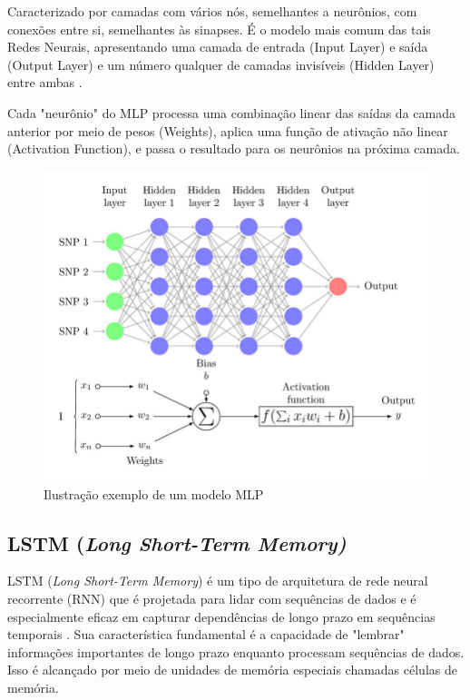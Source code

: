 Caracterizado por camadas com vários nós, semelhantes a neurônios,
com conexões entre si, semelhantes às sinapses. É o modelo mais comum das tais Redes Neurais, apresentando uma camada de entrada (Input Layer) e saída (Output Layer) e um número qualquer de camadas invisíveis (Hidden Layer) entre ambas \cite{hastie_09_elements-of.statistical-learning}.

Cada "neurônio" do MLP processa uma combinação linear das saídas da camada anterior por meio de pesos (Weights), aplica uma função de ativação não linear (Activation Function), e passa o resultado para os neurônios na próxima camada.

\begin{figure}[H]
	\centering
	\begin{minipage}{0.9\linewidth}
		\centering
		\includegraphics[width=\linewidth]{tg1/figuras/Multi-Layer-Perceptron-MLP-diagram-with-four-hidden-layers-and-a-collection-of-single.png}
		\caption{Ilustração exemplo de um modelo MLP
            \cite{mlp_fig}} \label{fig:mlpmodel}
	\end{minipage}
\end{figure}

\subsection{\textbf{LSTM (\textit{Long Short-Term Memory) }}}

LSTM (\textit{Long Short-Term Memory}) é um tipo de arquitetura de rede neural recorrente (RNN) que é projetada para lidar com sequências de dados e é especialmente eficaz em capturar dependências de longo prazo em sequências temporais \cite{lstm-}. Sua característica fundamental é a capacidade de "lembrar" informações importantes de longo prazo enquanto processam sequências de dados. Isso é alcançado por meio de unidades de memória especiais chamadas células de memória.


